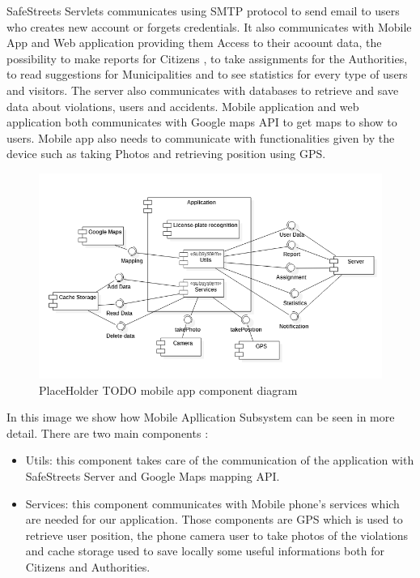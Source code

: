 SafeStreets Servlets communicates using SMTP protocol to send email to users who creates new account or forgets credentials. It also communicates with Mobile App and Web application providing them Access to their acoount data, the possibility to make reports for Citizens , to take assignments for the Authorities, to read suggestions for Municipalities and to see statistics for every type of users and visitors.
The server also communicates with databases to retrieve and save data about violations, users and accidents.
Mobile application and web application both communicates with Google maps API  to get maps to show to users. Mobile app also needs to communicate with functionalities given by the device such as taking Photos and retrieving position using GPS.
\newline
\begin{figure}[H]
\centering
\includegraphics{Images/MobileApplicationComponent.png}
\caption{\label{fig:ComWI}PlaceHolder TODO mobile app component diagram}
\end{figure}
In this image we show how Mobile Apllication Subsystem can be seen in more detail.
There are two main components : 
\begin{itemize}
\item Utils:  this component takes care of the communication of the application with SafeStreets Server and Google Maps mapping API.
\item Services: this component communicates with Mobile phone's services which are needed for our application. Those components are GPS which is used to retrieve user position, the phone camera user to take photos of the violations and cache storage used to save locally some useful informations both for Citizens and Authorities.
\end{itemize}
